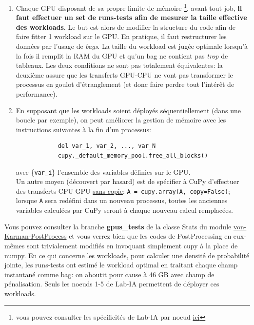 \documentclass[13pt, a4paper]{extarticle}
\begin{document}
\begin{tcolorbox}[colback=Goldenrod]
\begin{enumerate}
  \item Chaque GPU disposant de sa propre limite de mémoire \footnote{vous pouvez
  consulter les spécificités de Lab-IA par noeud \href{https://lab-ia.fr/specifications/}{ici}},
  avant tout job, {\bf il faut effectuer un set de runs-tests afin de mesurer la taille
  effective des workloads}. Le but est alors de modifier la structure du code
  afin de faire fitter 1 workload sur le GPU. En pratique, il faut restructurer 
  les données par l'usage de \emph{bags}. La taille du workload est jugée optimale
  lorsqu'à la fois il remplit la RAM du GPU et qu'un bag ne contient pas \emph{trop}
  de tableaux. Les deux conditions ne sont pas totalement équivalentes:
  la deuxième assure que les transferts GPU-CPU ne vont pas transformer le processus
  en goulot d'étranglement (et donc faire perdre tout l'intérêt de performance).
  \item En supposant que les workloads soient déployés séquentiellement (dans une boucle
        par exemple), on peut améliorer la gestion de mémoire avec les instructions suivantes
        à la fin d'un processus:
          \begin{verbatim}
            del var_1, var_2, ..., var_N
            cupy._default_memory_pool.free_all_blocks()
          \end{verbatim}
        avec \{\texttt{var\_i}\} l'ensemble des variables définies
        sur le GPU. \\ 
        Un autre moyen (découvert par hasard) est de spécifier 
        à CuPy d'effectuer des transferts CPU-GPU \ul{sans copie}:
        \texttt{A = cupy.array(A, copy=False)}; lorsque \texttt{A} sera redéfini
        dans un nouveau processus, toutes les anciennes variables calculées
        par CuPy seront à chaque nouveau calcul remplacées.
\end{enumerate}
\end{tcolorbox}

\noindent Vous pouvez consulter la branche {\bf gpus\_tests} de la classe Stats du module 
\href{https://gitlab.lisn.upsaclay.fr/allaglo/von-karman-postprocess/-/tree/gpus_tests?ref_type=heads}
{von-Karman-PostProcess} et vous verrez bien que les codes de PostProcessing en eux-mêmes
sont trivialement modifiés en invoquant simplement cupy à la place de numpy. 
En ce qui concerne les workloads, pour calculer une densité de probabilité
jointe, les runs-tests ont estimé le workload optimal en traitant chaque champ instantané
comme bag: on aboutit pour cause à 46 GB avec champ de pénalisation. 
Seuls les noeuds 1-5 de Lab-IA permettent de déployer 
ces workloads. 
\end{document}
